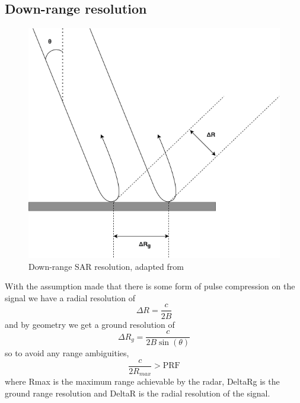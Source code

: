 \subsection{Down-range resolution}
\begin{figure}
\centering
\includegraphics[width=0.5\linewidth]{../figures/down_range}	
\caption{Down-range SAR resolution, adapted from \cite{richardsRemoteSensingImaging2009}}
\label{fig:down_range_SAR}
\end{figure}
With the assumption made that there is some form of pulse compression on the signal we have a radial resolution of \[\Delta R = \frac{c}{2B}\] and by geometry we get a ground resolution of \[\Delta R_g = \frac{c}{2B\sin(\theta)}\] so to avoid any range ambiguities, \[\frac{c}{2R_{max}} > \text{PRF} \] where \gls{Rmax} is the maximum range achievable by the radar, \gls{DeltaRg} is the ground range resolution and \gls{DeltaR} is the radial resolution of the signal.
